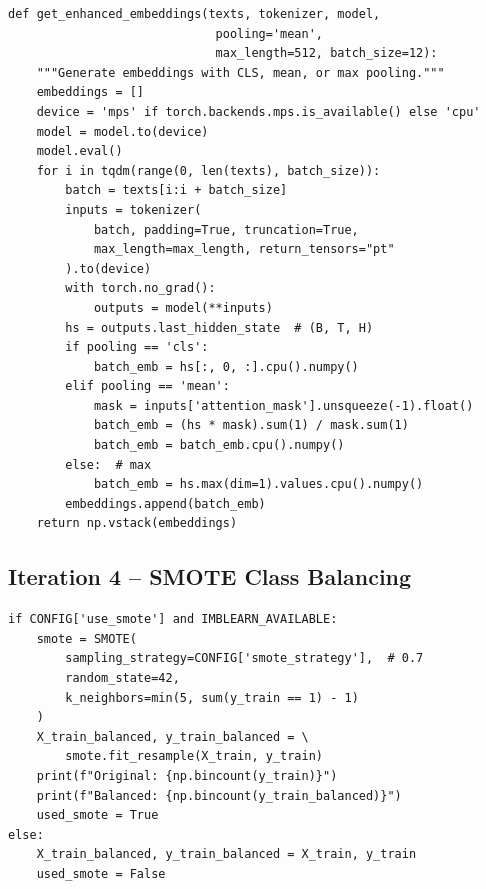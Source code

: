 \documentclass[11pt, titlepage, bibliography=totoc]{scrreprt}
\begin{document}
\begin{lstlisting}[label=lst:enhanced-embedding,
  caption={Enhanced embedding generation supporting CLS, mean, and max pooling strategies (Iteration~4).}]
def get_enhanced_embeddings(texts, tokenizer, model,
                             pooling='mean',
                             max_length=512, batch_size=12):
    """Generate embeddings with CLS, mean, or max pooling."""
    embeddings = []
    device = 'mps' if torch.backends.mps.is_available() else 'cpu'
    model = model.to(device)
    model.eval()
    for i in tqdm(range(0, len(texts), batch_size)):
        batch = texts[i:i + batch_size]
        inputs = tokenizer(
            batch, padding=True, truncation=True,
            max_length=max_length, return_tensors="pt"
        ).to(device)
        with torch.no_grad():
            outputs = model(**inputs)
        hs = outputs.last_hidden_state  # (B, T, H)
        if pooling == 'cls':
            batch_emb = hs[:, 0, :].cpu().numpy()
        elif pooling == 'mean':
            mask = inputs['attention_mask'].unsqueeze(-1).float()
            batch_emb = (hs * mask).sum(1) / mask.sum(1)
            batch_emb = batch_emb.cpu().numpy()
        else:  # max
            batch_emb = hs.max(dim=1).values.cpu().numpy()
        embeddings.append(batch_emb)
    return np.vstack(embeddings)
\end{lstlisting}

\subsection*{Iteration 4 -- SMOTE Class Balancing}

\begin{lstlisting}[label=lst:smote,
  caption={SMOTE oversampling applied to the training set in Iteration~4.}]
if CONFIG['use_smote'] and IMBLEARN_AVAILABLE:
    smote = SMOTE(
        sampling_strategy=CONFIG['smote_strategy'],  # 0.7
        random_state=42,
        k_neighbors=min(5, sum(y_train == 1) - 1)
    )
    X_train_balanced, y_train_balanced = \
        smote.fit_resample(X_train, y_train)
    print(f"Original: {np.bincount(y_train)}")
    print(f"Balanced: {np.bincount(y_train_balanced)}")
    used_smote = True
else:
    X_train_balanced, y_train_balanced = X_train, y_train
    used_smote = False
\end{lstlisting}

\end{document}
